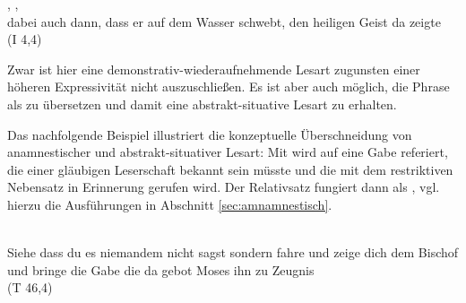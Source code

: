 %

\begin{exe}
\ex \label{ex:I2245} \gll {}  ,      ,       \\
{dabei} {auch} {dann}, {dass} {er} {auf} {dem} {Wasser} {schwebt}, {den} {heiligen} {Geist} {da} {zeigte}\\
\glt {} (I 4,4)
\end{exe}

\noindent 
Zwar ist hier  eine demonstrativ-wiederaufnehmende Lesart zugunsten einer höheren Expressivität nicht auszuschließen. Es ist aber auch möglich, die Phrase als  zu übersetzen und damit eine abstrakt-situative Lesart zu erhalten. 



Das nachfolgende Beispiel illustriert die konzeptuelle Überschneidung von anamnestischer und abstrakt-situativer Lesart: Mit  wird auf eine Gabe referiert, die einer gläubigen Leserschaft bekannt sein müsste und die mit dem restriktiven Nebensatz in Erinnerung gerufen wird. Der Relativsatz fungiert dann als  \parencite[78f.]{Himmelmann1997}, vgl. hierzu die Ausführungen in Abschnitt \ref{sec:amnamnestisch}. 

%

\begin{exe}
\ex \label{ex:T9827} \gll {}       \object{,}                   \\
{Siehe} {dass} {du} {es} {niemandem} {nicht} {sagst} {} {sondern} {fahre} {und} {zeige} {dich} {dem} {Bischof} {und} {bringe} {die} {Gabe} {die} {da} {gebot} {Moses} {ihn} {zu} {Zeugnis} {}\\
\glt {} (T 46,4)
\end{exe}


